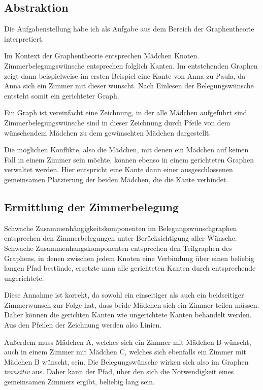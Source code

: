 \subsection{Abstraktion}
Die Aufgabenstellung habe ich als Aufgabe aus dem Bereich der Graphentheorie
interpretiert.

Im Kontext der Graphentheorie entsprechen Mädchen Knoten.
Zimmerbelegungswünsche entsprechen folglich Kanten.
Im entstehenden Graphen zeigt dann beispielweise im ersten Beispiel eine Kante von Anna
zu Paula, da Anna sich ein Zimmer mit dieser wünscht.
Nach Einlesen der Belegungswünsche entsteht somit ein gerichteter Graph.

Ein Graph ist vereinfacht eine Zeichnung, in der alle Mädchen aufgeführt sind.
Zimmerbelegungswünsche sind in dieser Zeichnung durch Pfeile von dem wünschendem
Mädchen zu dem gewünschten Mädchen dargestellt.

Die möglichen Konflikte, also die Mädchen, mit denen ein Mädchen auf keinen Fall
in einem Zimmer sein möchte, können ebenso in einem gerichteten Graphen verwaltet werden.
Hier entspricht eine Kante dann einer ausgeschlossenen gemeinsamen Platzierung
der beiden Mädchen, die die Kante verbindet.

\subsection{Ermittlung der Zimmerbelegung}
\begin{annahme} \label{theo:annahme}
Schwache Zusammenhängigkeitskomponenten im Belegungswunschgraphen entsprechen den
Zimmerbelegungen unter Berücksichtigung aller Wünsche.
Schwache Zusammenhangskomponenten\autocite[Definiton. Gerichtete Graphen]{WikiZus}
entsprechen den Teilgraphen des Graphens, in denen zwischen jedem Knoten eine
Verbindung über einen beliebig langen Pfad bestünde,
ersetzte man alle gerichteten Kanten durch entsprechende ungerichtete.
\end{annahme}

Diese Annahme ist korrekt, da sowohl ein einseitiger als auch ein beidseitiger
Zimmerwunsch zur Folge hat, dass beide Mädchen sich ein Zimmer teilen müssen.
Daher können die gerichten Kanten wie ungerichtete Kanten behandelt werden.
Aus den Pfeilen der Zeichnung werden also Linien.

Außerdem muss Mädchen A, welches sich ein Zimmer mit Mädchen B wünscht,
auch in einem Zimmer mit Mädchen C,
welches sich ebenfalls ein Zimmer mit Mädchen B wünscht, sein.
Die Belegungswünsche wirken sich also im Graphen \textit{transitiv} aus.
Daher kann der Pfad, über den sich die Notwendigkeit eines gemeinsamen Zimmers ergibt,
beliebig lang sein.

